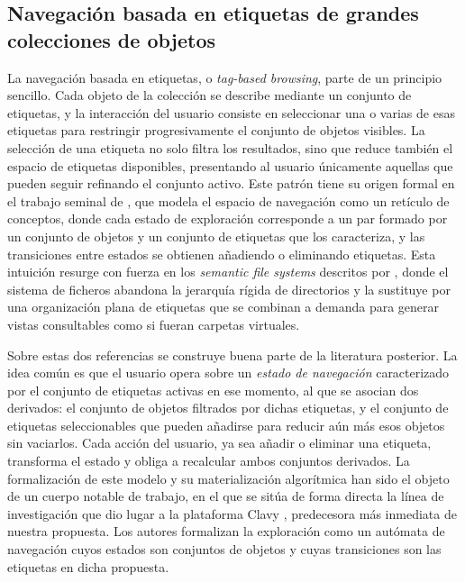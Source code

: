 \subsection{Navegación basada en etiquetas de grandes colecciones de objetos}
\label{subsec:tagBasedBrowsing}

La navegación basada en etiquetas, o \textit{tag-based browsing}, parte de un principio sencillo. Cada
objeto de la colección se describe mediante un conjunto de etiquetas, 
y la interacción del usuario consiste en seleccionar una o varias de esas etiquetas para
restringir progresivamente el conjunto de objetos visibles. La selección de una etiqueta no solo filtra
los resultados, sino que reduce también el espacio de etiquetas disponibles, presentando al usuario
únicamente aquellas que pueden seguir refinando el conjunto activo. Este patrón tiene su origen formal
en el trabajo seminal de \citet{godin1986lattice}, que modela el espacio de navegación como un retículo
de conceptos, donde cada estado de exploración corresponde a un par formado por un conjunto de
objetos y un conjunto de etiquetas que los caracteriza, y las transiciones entre estados se obtienen
añadiendo o eliminando etiquetas. Esta intuición resurge con fuerza en los \textit{semantic file systems}
descritos por \citet{gifford1991semantic}, donde el sistema de ficheros abandona la jerarquía rígida de
directorios y la sustituye por una organización plana de etiquetas que se combinan a demanda para
generar vistas consultables como si fueran carpetas virtuales.

Sobre estas dos referencias se construye buena parte de la literatura posterior. La idea común es que el
usuario opera sobre un \textit{estado de navegación} caracterizado por el conjunto de etiquetas activas en
ese momento, al que se asocian dos derivados: el conjunto de objetos filtrados por dichas etiquetas, y el
conjunto de etiquetas seleccionables que pueden añadirse para reducir aún más esos objetos sin
vaciarlos. Cada acción del usuario, ya sea añadir o eliminar una etiqueta, transforma el estado y obliga
a recalcular ambos conjuntos derivados. La formalización de este modelo y su materialización
algorítmica han sido el objeto de un cuerpo notable de trabajo, en el que se sitúa de forma directa
la línea de investigación que dio lugar a la plataforma Clavy \citep{gayoso2016siie}, predecesora más
inmediata de nuestra propuesta. Los autores formalizan la exploración como un autómata de navegación cuyos 
estados son conjuntos de objetos y cuyas transiciones son las etiquetas en dicha propuesta.

